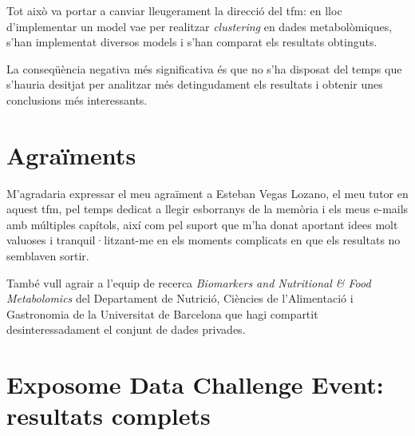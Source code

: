 \documentclass[CAT,BIB]{TFUOC}%
\begin{document}
            Tot això va portar a canviar lleugerament
            la direcció del \gls{tfm}:
            en lloc d'implementar un model \gls{vae}
            per realitzar \textit{clustering}
            en dades metabolòmiques,
            s'han implementat diversos models i s'han comparat els resultats obtinguts.

            La conseqüència negativa més significativa
            és que no s'ha disposat del temps que s'hauria desitjat
            per analitzar més detingudament els resultats
            i obtenir unes conclusions més interessants.


\printglossary[type=\acronymtype, title={Glossari i abreviacions}]




\chapter*{Agraïments}

    M'agradaria expressar el meu agraïment a Esteban Vegas Lozano,
    el meu tutor en aquest \gls{tfm},
    pel temps dedicat a llegir esborranys de la memòria
    i els meus e-mails amb múltiples capítols,
    així com pel suport que m'ha donat aportant idees molt valuoses
    i tranquil·litzant-me en els moments complicats
    en que els resultats no semblaven sortir.

    També vull agrair a l'equip de recerca
    \textit{Biomarkers and Nutritional \& Food Metabolomics}
    del Departament de Nutrició, Ciències de l'Alimentació i Gastronomia
    de la Universitat de Barcelona
    que hagi compartit desinteressadament el conjunt de dades \gls{privades}.

\newpage
\appendix

\chapter{Exposome Data Challenge Event: resultats complets}
\label{a:exposome}
\end{document}

